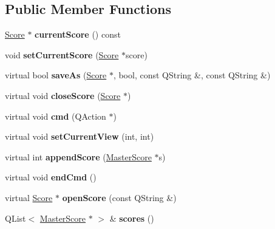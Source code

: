 \subsection*{Public Member Functions}
\begin{DoxyCompactItemize}
\item 
\mbox{\label{class_ms_1_1_muse_score_core_ab111365b4a98946fdfda5b68f4abe2ac}} 
\hyperlink{class_ms_1_1_score}{Score} $\ast$ {\bfseries current\+Score} () const
\item 
\mbox{\label{class_ms_1_1_muse_score_core_abb40a8607310cb1bf4c8b8062171e1f9}} 
void {\bfseries set\+Current\+Score} (\hyperlink{class_ms_1_1_score}{Score} $\ast$score)
\item 
\mbox{\label{class_ms_1_1_muse_score_core_a4037d1c8d091c0fad5204ddb9c7e61f3}} 
virtual bool {\bfseries save\+As} (\hyperlink{class_ms_1_1_score}{Score} $\ast$, bool, const Q\+String \&, const Q\+String \&)
\item 
\mbox{\label{class_ms_1_1_muse_score_core_a054ff3e5de76448baea3c24abe2c15a0}} 
virtual void {\bfseries close\+Score} (\hyperlink{class_ms_1_1_score}{Score} $\ast$)
\item 
\mbox{\label{class_ms_1_1_muse_score_core_a5317c571cdbf6bf92a0a57767fefb776}} 
virtual void {\bfseries cmd} (Q\+Action $\ast$)
\item 
\mbox{\label{class_ms_1_1_muse_score_core_a278e44e550fb75667b6cf7b51e5df3ee}} 
virtual void {\bfseries set\+Current\+View} (int, int)
\item 
\mbox{\label{class_ms_1_1_muse_score_core_a6375a9697c0a7c14b34f7ad73fbc635f}} 
virtual int {\bfseries append\+Score} (\hyperlink{class_ms_1_1_master_score}{Master\+Score} $\ast$s)
\item 
\mbox{\label{class_ms_1_1_muse_score_core_a688848420db16dbfc32d3976621475a2}} 
virtual void {\bfseries end\+Cmd} ()
\item 
\mbox{\label{class_ms_1_1_muse_score_core_a3db26c035194c6b7f08050861fa7fcee}} 
virtual \hyperlink{class_ms_1_1_score}{Score} $\ast$ {\bfseries open\+Score} (const Q\+String \&)
\item 
\mbox{\label{class_ms_1_1_muse_score_core_ab1e13cca1f0dde1519331392ec10ee56}} 
Q\+List$<$ \hyperlink{class_ms_1_1_master_score}{Master\+Score} $\ast$ $>$ \& {\bfseries scores} ()
\end{DoxyCompactItemize}
